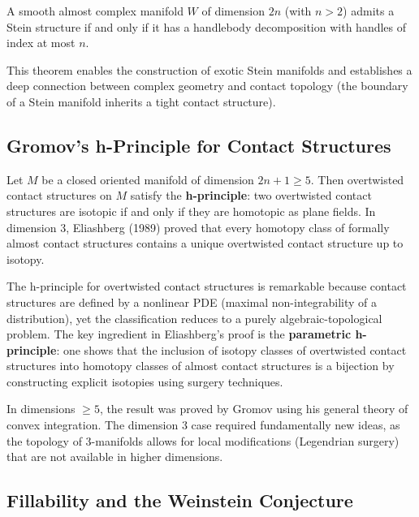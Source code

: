 \begin{theorem}[Eliashberg, 1990]
A smooth almost complex manifold $W$ of dimension $2n$ (with $n > 2$) admits a Stein structure if and only if it has a handlebody decomposition with handles of index at most $n$.
\end{theorem}

This theorem enables the construction of exotic Stein manifolds and establishes a deep connection between complex geometry and contact topology (the boundary of a Stein manifold inherits a tight contact structure).

\subsection{Gromov's h-Principle for Contact Structures}

\begin{theorem}
Let $M$ be a closed oriented manifold of dimension $2n+1 \geq 5$. Then overtwisted contact structures on $M$ satisfy the \textbf{h-principle}: two overtwisted contact structures are isotopic if and only if they are homotopic as plane fields. In dimension 3, Eliashberg (1989) proved that every homotopy class of formally almost contact structures contains a unique overtwisted contact structure up to isotopy.
\end{theorem}

\begin{remark}
The h-principle for overtwisted contact structures is remarkable because contact structures are defined by a nonlinear PDE (maximal non-integrability of a distribution), yet the classification reduces to a purely algebraic-topological problem. The key ingredient in Eliashberg's proof is the \textbf{parametric h-principle}: one shows that the inclusion of isotopy classes of overtwisted contact structures into homotopy classes of almost contact structures is a bijection by constructing explicit isotopies using surgery techniques.
\end{remark}

\begin{remark}
In dimensions $\geq 5$, the result was proved by Gromov using his general theory of convex integration. The dimension 3 case required fundamentally new ideas, as the topology of 3-manifolds allows for local modifications (Legendrian surgery) that are not available in higher dimensions.
\end{remark}

\subsection{Fillability and the Weinstein Conjecture}

